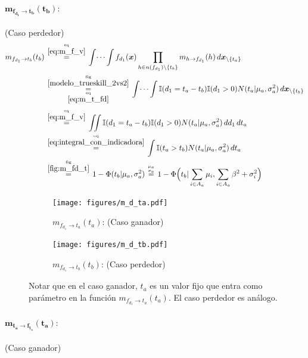 \documentclass[article]{jss}
\newcommand\hfrac[2]{\genfrac{}{}{0pt}{}{#1}{#2}} %
\begin{document}
\begin{appendix}
\paragraph{$\bm{m_{f_{d_1} \rightarrow t_b}(t_b)}:$} (Caso perdedor)
\begin{equation}\label{eq:m_fd_tb}
\begin{split}
m_{f_{d_1} \rightarrow t_b}(t_b) &\overset{\hfrac{\text{eq}}{\ref{eq:m_f_v}}}{=} \int \dots \int f_{d_1}(\bm{x}) \prod_{h \in n(f_{d_1}) \setminus \{t_b\} } m_{h \rightarrow f_{d_1}}(h) \, d\bm{x}_{\setminus \{t_a\} }  \\
&\overset{\hfrac{\text{fig}}{\ref{modelo_trueskill_2vs2}}}{\underset{\hfrac{\text{eq}}{\ref{eq:m_t_fd}}}{=}}  \int \dots \int \mathbb{I}(d_1 = t_a - t_b) \mathbb{I}(d_1 > 0) N(t_a | \mu_a , \sigma_a^2 )  \, d\bm{x}_{\setminus \{t_b\} } \\[0.1cm]
&\overset{\hfrac{\text{eq}}{\ref{eq:m_f_v}}}{=} \iint \mathbb{I}(d_1 = t_a - t_b) \mathbb{I}(d_1 > 0)  N(t_a | \mu_a , \sigma_a^2 )  \, dd_1\,dt_a \\
&\overset{\hfrac{\text{eq}}{\ref{eq:integral_con_indicadora}}}{=} \int \mathbb{I}( t_a > t_b)   N(t_a | \mu_a , \sigma_a^2 ) \,dt_a \\
&\overset{\hfrac{\text{fig}}{\ref{fig:m_fd_t}}}{=} 1 - \Phi (t_b| \mu_a , \sigma_a^2 ) \overset{\hfrac{\mu_a}{\sigma_a}}{=} 1 - \Phi \Big(t_b| \sum_{i \in A_a} \mu_i , \sum_{i \in A_a} \beta^2 + \sigma_i^2 \Big)
\end{split}
\end{equation}

\begin{figure}[t!]
\centering
  \begin{subfigure}[t]{0.48\textwidth}
  \texttt{[image: figures/m\_d\_ta.pdf]}
  \caption{$m_{f_{d_1} \rightarrow t_a}(t_a)$: (Caso ganador)}
  \label{fig:m_fd_ta}
  \end{subfigure}
  \begin{subfigure}[t]{0.48\textwidth}
  \texttt{[image: figures/m\_d\_tb.pdf]}
  \caption{$m_{f_{d_1} \rightarrow t_b}(t_b)$: (Caso perdedor)}
  \label{fig:m_fd_tb}
  \end{subfigure}
  \caption{Notar que en el caso ganador, $t_a$ es un valor fijo que entra como par\'ametro en la funci\'on $m_{f_{d_1} \rightarrow t_a}(t_a)$. El caso perdedor es an\'alogo.}
  \label{fig:m_fd_t}
\end{figure}

\paragraph{$\bm{m_{t_a \rightarrow f_{t_a}}(t_a)}:$} (Caso ganador)


\end{appendix}
\end{document}
